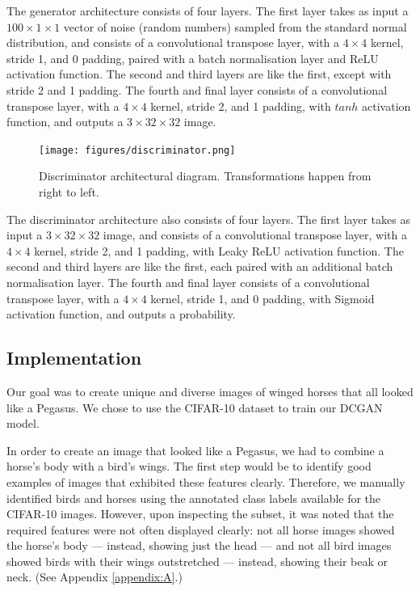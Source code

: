 \documentclass{article}
\begin{document}
The generator architecture consists of four layers. The first layer takes as input a $100 \times 1 \times 1$ vector of noise (random numbers) sampled from the standard normal distribution, and consists of a convolutional transpose layer, with a $4 \times 4$ kernel, stride 1, and 0 padding, paired with a batch normalisation layer and ReLU activation function. The second and third layers are like the first, except with stride 2 and 1 padding. The fourth and final layer consists of a convolutional transpose layer, with a $4 \times 4$ kernel, stride 2, and 1 padding, with $tanh$ activation function, and outputs a $3 \times 32 \times 32$ image.  

\begin{figure}[h]
    \begin{center}
        \texttt{[image: figures/discriminator.png]}
    \end{center}
    \caption{Discriminator architectural diagram. Transformations happen from right to left.}
    \label{fig:discriminator}
\end{figure}

The discriminator architecture also consists of four layers. The first layer takes as input a $3 \times 32 \times 32$ image, and consists of a convolutional transpose layer, with a $4 \times 4$ kernel, stride 2, and 1 padding, with Leaky ReLU activation function. The second and third layers are like the first, each paired with an additional batch normalisation layer. The fourth and final layer consists of a convolutional transpose layer, with a $4 \times 4$ kernel, stride 1, and 0 padding, with Sigmoid activation function, and outputs a probability. 

\subsection{Implementation} \label{implementation}
Our goal was to create unique and diverse images of winged horses that all looked like a Pegasus. We chose to use the CIFAR-10 dataset to train our DCGAN model.

In order to create an image that looked like a Pegasus, we had to combine a horse's body with a bird's wings. The first step would be to identify good examples of images that exhibited these features clearly. Therefore, we manually identified birds and horses using the annotated class labels available for the CIFAR-10 images. However, upon inspecting the subset, it was noted that the required features were not often displayed clearly: not all horse images showed the horse's body --- instead, showing just the head --- and not all bird images showed birds with their wings outstretched --- instead, showing their beak or neck. (See Appendix \ref{appendix:A}.)
\end{document}
